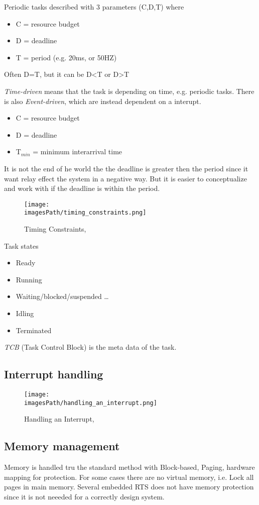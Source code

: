 Periodic tasks described with 3 parameters (C,D,T) where
\begin{itemize}
\item C = resource budget
\item D = deadline
\item T = period (e.g. 20ms, or 50HZ)
\end{itemize}
Often D=T, but it can be D<T or D>T

\textit{Time-driven} means that the task is depending on time, e.g. periodic tasks. 
There is also \textit{Event-driven}, which are instead dependent on a interupt.
\begin{itemize}
\item C = resource budget
\item D = deadline
\item T$_{min}$ = minimum interarrival time
\end{itemize}

It is not the end of he world the the deadline is greater
then the period since it want relay effect the system in a negative way.
But it is easier to conceptualize and work with if the deadline is within the period.

\newpage
\begin{figure}[H]
    \centering
    \texttt{[image: \\imagesPath/timing\_constraints.png]}
    \caption{Timing Constraints, \cite{RTOS, p.21}}
\end{figure}


Task states
\begin{itemize}
\item Ready
\item Running
\item Waiting/blocked/suspended \ldots
\item Idling
\item Terminated
\end{itemize}

\textit{TCB} (Task Control Block) is the meta data of the task.


\subsection{Interrupt handling}
\begin{figure}[H]
    \centering
    \texttt{[image: \\imagesPath/handling\_an\_interrupt.png]}
    \caption{Handling an Interrupt, \cite{RTOS, p.29}}
\end{figure}


\subsection{Memory management}
Memory is handled tru the standard method with Block-based, Paging, hardware mapping for protection.
For some cases there are no virtual memory, i.e. Lock all pages in main memory.
Several embedded RTS does not have memory protection since it is not neeeded for a correctly design system. 


